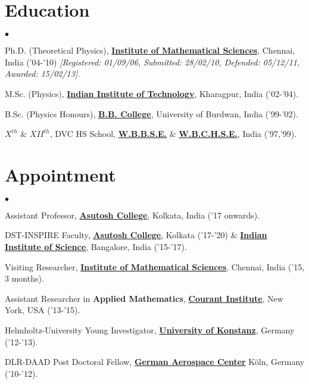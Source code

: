 \documentclass[margin,line]{res}
\newenvironment{list2}{
  \begin{list}{$\bullet$}{%
      \setlength{\itemsep}{0in}
      \setlength{\parsep}{0in} \setlength{\parskip}{0in}
      \setlength{\topsep}{0in} \setlength{\partopsep}{0in} 
      \setlength{\leftmargin}{0.2in}}}{\end{list}}
\begin{document}
\begin{resume}
\section{\sc Education}
\begin{list2}
\item Ph.D. (Theoretical Physics), {\bf \href{http://www.imsc.res.in/}{Institute of Mathematical Sciences}}, Chennai, India ('04-'10) 
{\it [Registered: 01/09/06, Submitted: 28/02/10, Defended: 05/12/11, Awarded: 15/02/13]}.
\item M.Sc. (Physics), {\bf \href{http://www.iitkgp.ac.in/}{Indian Institute of Technology}}, Kharagpur, India ('02-'04). 
\item B.Sc. (Physics Honours), {\bf \href{http://www.bbcollege.ac.in/}{B.B. College}}, University of Burdwan, India ('99-'02).
\item $X^{th}$ \& $XII^{th}$, DVC HS School, {\bf \href{http://wbbse.org/}{W.B.B.S.E.}} \& {\bf \href{http://wbchse.nic.in/html/index.html}{W.B.C.H.S.E.}}, India ('97,'99).
\end{list2}
\vspace{1mm}

\section{\sc Appointment}
\begin{list2}
\item Assistant Professor, {\bf \href{http://www.asutoshcollege.in/}{Asutosh College}}, Kolkata, India ('17 onwards). 
\item DST-INSPIRE Faculty, {\bf \href{http://www.physics.iisc.ernet.in/}{Asutosh College}}, Kolkata ('17-'20) \& 
                           {\bf \href{http://www.physics.iisc.ernet.in/}{Indian Institute of Science}}, Bangalore, India ('15-'17).
\item Visiting Researcher, {\bf \href{http://www.imsc.res.in/}{Institute of Mathematical Sciences}}, Chennai, India ('15, 3 months).
\item Assistant Researcher in {\bf Applied Mathematics}, {\bf \href{http://cims.nyu.edu/}{Courant Institute}}, New York, USA ('13-'15).
\item Helmholtz-University Young Investigator, {\bf \href{http://www.uni-konstanz.de/en/welcome/}{University of Konstanz}}, Germany ('12-'13).
\item DLR-DAAD Post Doctoral Fellow, {\bf \href{http://www.dlr.de/mp/en/}{German Aerospace Center}} K\"{o}ln, Germany ('10-'12).
\end{list2}
\vspace{1mm}


\end{resume}
\end{document}
